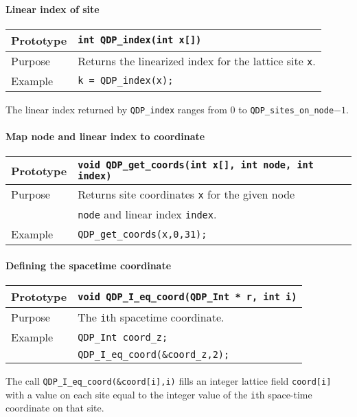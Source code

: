 \documentclass{article}
\newcommand{\tInt}{QDP\ttdash Int }
\newcommand{\ttdash}{{\tt \_}}
\begin{document}
\paragraph{Linear index of site}

\begin{flushleft}
  \begin{tabular}{|l|l|}
  \hline
  Prototype      & \verb|int QDP_index(int x[])|\\
    \hline
  Purpose        & Returns the linearized index for the lattice site \verb|x|. \\
\hline
  Example  & \verb|k = QDP_index(x);| \\
   \hline
 \end{tabular}
\end{flushleft}
The linear index returned by \verb|QDP_index| ranges from 0 to
\verb|QDP_sites_on_node|$ - 1$.

\paragraph{Map node and linear index to coordinate}

\begin{flushleft}
  \begin{tabular}{|l|l|}
  \hline
  Prototype      & \verb|void QDP_get_coords(int x[], int node, int index)|\\
    \hline
  Purpose        & Returns site coordinates \verb|x| for the given node  \\
                 & \verb|node| and linear index \verb|index|. \\
\hline
  Example  & \verb|QDP_get_coords(x,0,31);| \\
   \hline
 \end{tabular}
\end{flushleft}

\paragraph{Defining the spacetime coordinate}

\begin{flushleft}
  \begin{tabular}{|l|l|}
  \hline
  Prototype      & \verb|void QDP_I_eq_coord|{\tt (\tInt * r, int i)}\\
    \hline
  Purpose        & The {\tt i}th spacetime coordinate. \\
\hline
  Example  & \verb|QDP_Int coord_z;| \\
           & \verb|QDP_I_eq_coord(&coord_z,2);| \\
   \hline
 \end{tabular}
\end{flushleft}
%
The call \verb|QDP_I_eq_coord(&coord[i],i)| fills an integer lattice
field \verb|coord[i]| with a value on each site equal to the integer
value of the \verb|i|th space-time coordinate on that site.
\end{document}
